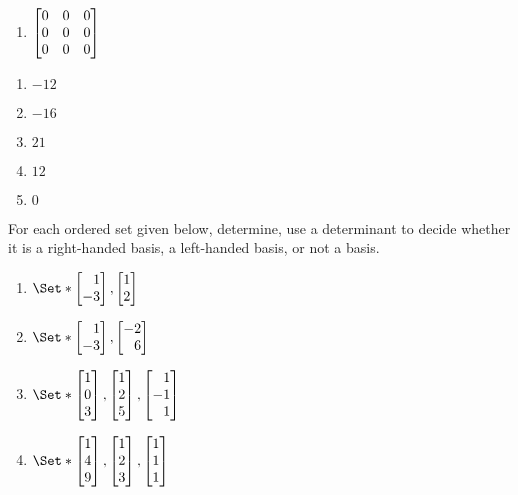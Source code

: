 \begin{exercises}
\begin{problist}
\begin{enumerate}
			\item $\mat{0 & 0 & 0 \\ 0 & 0 & 0 \\ 0 & 0 & 0}$
		\end{enumerate}
        \begin{solution}
        \begin{enumerate}
            \item $-12$
            \item $-16$
            \item $21$
            \item $12$
            \item $0$
        \end{enumerate}
        \end{solution}

		\prob For each ordered set given below, determine, use
		a determinant to decide whether it is a right-handed basis, a left-handed basis,
		or not a basis.
		\begin{enumerate}
			\item $\Set*{\mat{1 \\ -3},\mat{1 \\ 2}}$

			\item $\Set*{\mat{1 \\ -3},\mat{-2 \\ 6}}$

			\item $\Set*{\mat{1 \\ 0 \\ 3},\mat{1 \\ 2 \\ 5},\mat{1 \\ -1 \\ 1}}$

			\item $\Set*{\mat{1 \\ 4 \\ 9},\mat{1 \\ 2 \\ 3},\mat{1 \\ 1 \\ 1}}$


\end{enumerate}
\end{problist}
\end{exercises}
